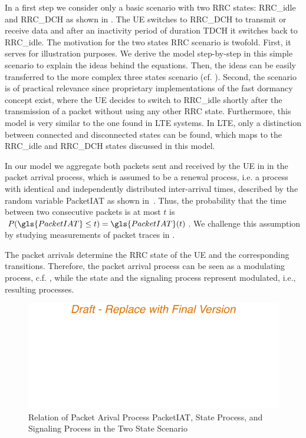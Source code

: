 In a first step we consider only a basic scenario with two \gls{RRC} states: \gls{RRC_idle} and \gls{RRC_DCH} as shown in .
The \gls{UE} switches to \gls{RRC_DCH} to transmit or receive data and after an inactivity period of duration \gls{TDCH} it switches back to \gls{RRC_idle}. 
The motivation for the two states \gls{RRC} scenario is twofold.
First, it serves for illustration purposes.
We derive the model step-by-step in this simple scenario to explain the ideas behind the equations.
Then, the ideas can be easily transferred to the more complex three states scenario (cf. ).
Second, the scenario is of practical relevance since proprietary implementations of the fast dormancy concept \cite{NSN2011} exist, where the \gls{UE} decides to switch to \gls{RRC_idle} shortly after the transmission of a packet without using any other \gls{RRC} state.
Furthermore, this model is very similar to the one found in \gls{LTE} systems.
In \gls{LTE}, only a distinction between connected and disconnected states can be found, which maps to the \gls{RRC_idle} and \gls{RRC_DCH} states discussed in this model.

In our model we aggregate both packets sent and received by the \gls{UE} in in the packet arrival process, which is assumed to be a renewal process, i.e. a process  with identical and independently distributed inter-arrival times, described by the random variable \gls{PacketIAT} as shown in~.
Thus, the probability that the time between two consecutive packets is at most \(t\) is \(P(\gls{PacketIAT} \leq t) = \gls{PacketIAT}(t)\).
We challenge this assumption by studying measurements of packet traces in .

The packet arrivals determine the \gls{RRC} state of the \gls{UE} and the corresponding transitions. Therefore, the packet arrival process can be seen as a modulating process, c.f. \cite{TranGia1983,TranGia1988}, while the state and the signaling process represent modulated, i.e., resulting processes.

\begin{figure}
  \centering
  \includegraphics{network/performance_model/system_description/figures/arrival_process}
  \caption{Relation of Packet Arival Process \acrshort{PacketIAT}, State Process, and Signaling Process in the Two State Scenario}
  \label{fig:network:performance_model:system_description:arrival_process}
\end{figure}

